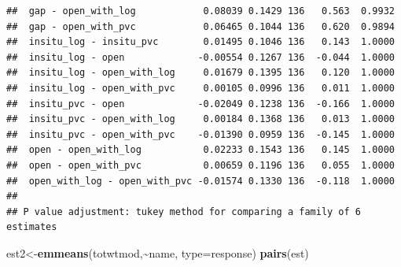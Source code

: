 \documentclass[
]{article}
\newenvironment{Shaded}{\begin{snugshade}}{\end{snugshade}}
\newcommand{\AttributeTok}[1]{\textcolor[rgb]{0.13,0.29,0.53}{#1}}
\newcommand{\FunctionTok}[1]{\textcolor[rgb]{0.13,0.29,0.53}{\textbf{#1}}}
\newcommand{\NormalTok}[1]{#1}
\newcommand{\OtherTok}[1]{\textcolor[rgb]{0.56,0.35,0.01}{#1}}
\newcommand{\SpecialCharTok}[1]{\textcolor[rgb]{0.81,0.36,0.00}{\textbf{#1}}}
\newcommand{\StringTok}[1]{\textcolor[rgb]{0.31,0.60,0.02}{#1}}
\begin{document}
\begin{verbatim}
##  gap - open_with_log            0.08039 0.1429 136   0.563  0.9932
##  gap - open_with_pvc            0.06465 0.1044 136   0.620  0.9894
##  insitu_log - insitu_pvc        0.01495 0.1046 136   0.143  1.0000
##  insitu_log - open             -0.00554 0.1267 136  -0.044  1.0000
##  insitu_log - open_with_log     0.01679 0.1395 136   0.120  1.0000
##  insitu_log - open_with_pvc     0.00105 0.0996 136   0.011  1.0000
##  insitu_pvc - open             -0.02049 0.1238 136  -0.166  1.0000
##  insitu_pvc - open_with_log     0.00184 0.1368 136   0.013  1.0000
##  insitu_pvc - open_with_pvc    -0.01390 0.0959 136  -0.145  1.0000
##  open - open_with_log           0.02233 0.1543 136   0.145  1.0000
##  open - open_with_pvc           0.00659 0.1196 136   0.055  1.0000
##  open_with_log - open_with_pvc -0.01574 0.1330 136  -0.118  1.0000
## 
## P value adjustment: tukey method for comparing a family of 6 estimates
\end{verbatim}

\begin{Shaded}
\begin{Highlighting}[]
\NormalTok{est2}\OtherTok{\textless{}{-}}\FunctionTok{emmeans}\NormalTok{(totwtmod,}\SpecialCharTok{\textasciitilde{}}\NormalTok{name, }\AttributeTok{type=}\StringTok{\textquotesingle{}response\textquotesingle{}}\NormalTok{)}
\FunctionTok{pairs}\NormalTok{(est)}
\end{Highlighting}
\end{Shaded}
\end{document}
